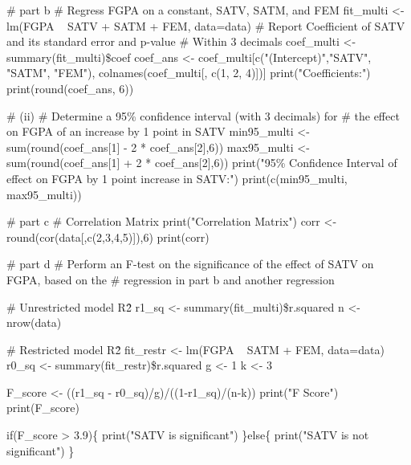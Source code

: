 \documentclass{article}
\begin{document}
\begin{flushleft}
\begin{enumerate}[label=(\alph*)]
\# part b
\# Regress FGPA on a constant, SATV, SATM, and FEM
fit\_multi <- lm(FGPA ~ SATV + SATM + FEM, data=data)
\# Report Coefficient of SATV and its standard error and p-value
\# Within 3 decimals
coef\_multi <- summary(fit\_multi)\$coef
coef\_ans <- coef\_multi[c("(Intercept)","SATV", "SATM", "FEM"), colnames(coef\_multi[, c(1, 2, 4)])]
print("Coefficients:")
print(round(coef\_ans, 6))

\# (ii)
\# Determine a 95\% confidence interval (with 3 decimals) for
\# the effect on FGPA of an increase by 1 point in SATV
min95\_multi <- sum(round(coef\_ans[1] - 2 * coef\_ans[2],6))
max95\_multi <- sum(round(coef\_ans[1] + 2 * coef\_ans[2],6))
print("95\% Confidence Interval of effect on FGPA by 1 point increase in SATV:")
print(c(min95\_multi, max95\_multi))

\# part c
\# Correlation Matrix
print("Correlation Matrix")
corr <- round(cor(data[,c(2,3,4,5)]),6)
print(corr)

\# part d
\# Perform an F-test on the significance of the effect of SATV on FGPA, based on the 
\# regression in part b and another regression

\# Unrestricted model R\^2
r1\_sq <- summary(fit\_multi)\$r.squared
n <- nrow(data)


\# Restricted model R\^2
fit\_restr <- lm(FGPA ~ SATM + FEM, data=data)
r0\_sq <- summary(fit\_restr)\$r.squared
g <- 1
k <- 3

F\_score <- ((r1\_sq - r0\_sq)/g)/((1-r1\_sq)/(n-k))
print("F Score")
print(F\_score)

if(F\_score > 3.9)\{
  print("SATV is significant")
\}else\{
  print("SATV is not significant")
\}

\end{enumerate}

\end{flushleft}
\end{document}
